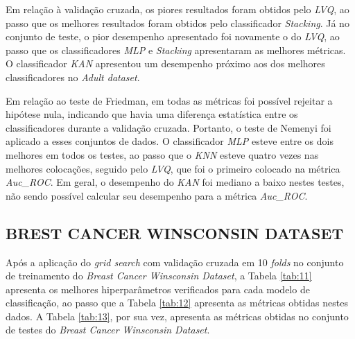 \documentclass[journal]{IEEEtran}
\begin{document}
Em relação à validação cruzada, os piores resultados foram obtidos pelo \textit{LVQ}, ao passo que os melhores resultados foram obtidos pelo classificador \textit{Stacking}. Já no conjunto de teste, o pior desempenho apresentado foi novamente o do \textit{LVQ}, ao passo que os classificadores \textit{MLP} e \textit{Stacking} apresentaram as melhores métricas. O classificador \textit{KAN} apresentou um desempenho próximo aos dos melhores classificadores no \textit{Adult dataset}.

Em relação ao teste de Friedman, em todas as métricas foi possível rejeitar a hipótese nula, indicando que havia uma diferença estatística entre os classificadores durante a validação cruzada. Portanto, o teste de Nemenyi foi aplicado a esses conjuntos de dados. O classificador \textit{MLP} esteve entre os dois melhores em todos os testes, ao passo que o \textit{KNN} esteve quatro vezes nas melhores colocações, seguido pelo \textit{LVQ}, que foi o primeiro colocado na métrica \textit{Auc\_ROC}. Em geral, o desempenho do \textit{KAN} foi mediano a baixo nestes testes, não sendo possível calcular seu desempenho para a métrica \textit{Auc\_ROC}.

\subsection{BREST CANCER WINSCONSIN DATASET}

Após a aplicação do \textit{grid search} com validação cruzada em 10 \textit{folds} no conjunto de treinamento do \textit{Breast Cancer Winsconsin Dataset}, a Tabela \ref{tab:11} apresenta os melhores hiperparâmetros verificados para cada modelo de classificação, ao passo que a Tabela \ref{tab:12} apresenta as métricas obtidas nestes dados. A Tabela \ref{tab:13}, por sua vez, apresenta as métricas obtidas no conjunto de testes do \textit{Breast Cancer Winsconsin Dataset}.
\end{document}
